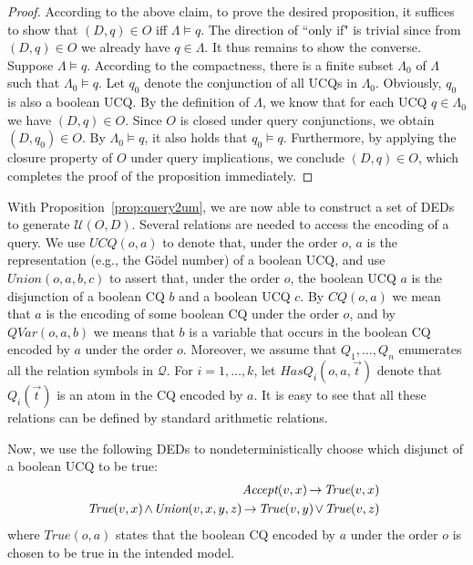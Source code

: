 \documentclass[letterpaper]{article} %
\theoremstyle{definition}
\theoremstyle{remark}
\theoremstyle{definition}
\begin{document}
\begin{proof}
According to the above claim, to prove the desired proposition, it suffices to show that $(D,q)\in O$ iff $\Lambda\vDash q$. The direction of ``only if" is trivial since from $(D,q)\in O$ we already have $q\in\Lambda$. It thus remains to show the converse. Suppose $\Lambda\vDash q$. According to the compactness, there is a finite subset $\Lambda_0$ of $\Lambda$ such that $\Lambda_0\vDash q$. Let $q_0$ denote the conjunction of all UCQs in $\Lambda_0$. Obviously, $q_0$ is also a boolean UCQ. By the definition of $\Lambda$, we know that for each UCQ $q\in\Lambda_0$ we have $(D,q)\in O$. Since $O$ is closed under query conjunctions, we obtain $(D,q_0)\in O$. By $\Lambda_0\vDash q$, it also holds that $q_0\vDash q$. Furthermore, by applying the closure property of $O$ under query implications, we conclude $(D,q)\in O$, which completes the proof of the proposition immediately. 
\end{proof}

With Proposition~\ref{prop:query2um}, we are now able to construct a set of DEDs to generate $\mathcal{U}(O,D)$. Several relations are needed to access the encoding of a query. We use $\textit{UCQ}(o,a)$ to denote that, under the order $o$, $a$ is the representation (e.g., the G\"{o}del number) of a boolean UCQ, and use $\textit{Union}(o,a,b,c)$ to assert that, under the order $o$, the boolean UCQ $a$ is the disjunction of a boolean CQ $b$ and a boolean UCQ $c$. By $\textit{CQ}(o,a)$ we mean that $a$ is the encoding of some boolean CQ under the order $o$, and by $\textit{QVar}(o,a,b)$ we means that $b$ is a variable that occurs in the boolean CQ encoded by $a$ under the order $o$. Moreover, we assume that $\textit{Q}_1,\dots,\textit{Q}_n$ enumerates all the relation symbols in $\mathscr{Q}$. For $i=1,\dots,k$, let $\textit{HasQ}_i(o,a,\vec{t})$ denote that $\textit{Q}_i(\vec{t})$ is an atom in the CQ encoded by $a$. It is easy to see that all these relations can be defined by standard arithmetic relations. 

Now, we use the following DEDs to nondeterministically choose which disjunct of a boolean UCQ to be true:
\begin{eqnarray}
\textit{Accept}(v,x)\hspace{-.04cm}\rightarrow\hspace{-.04cm}\textit{True}(v,x)\\
\!\!\!\textit{True}(v,x)\hspace{-.04cm}\wedge\hspace{-.04cm}\textit{Union}(v,x,y,z)\hspace{-.04cm}\rightarrow\hspace{-.04cm}\textit{True}(v,y)\hspace{-.04cm}\vee\hspace{-.04cm}\textit{True}(v,z)%
\end{eqnarray}
where $\textit{True}(o,a)$ states that the boolean CQ encoded by $a$ under the order $o$ is chosen to be true in the intended model.
\end{document}

